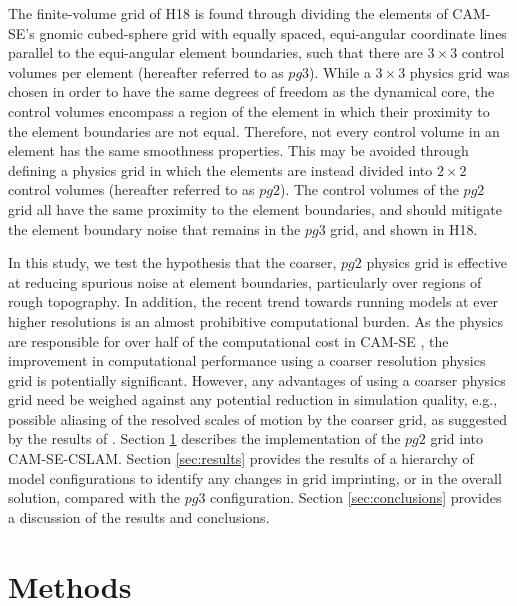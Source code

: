 \documentclass{agujournal}
\begin{document}
The finite-volume grid of H18 is found through dividing the elements of CAM-SE's gnomic cubed-sphere grid with equally spaced, equi-angular coordinate lines parallel to the equi-angular element boundaries, such that there are $3\times 3$ control volumes per element (hereafter referred to as $pg3$). While a $3\times 3$ physics grid was chosen in order to have the same degrees of freedom as the dynamical core, the control volumes encompass a region of the element in which their proximity to the element boundaries are not equal. Therefore, not every control volume in an element has the same smoothness properties. This may be avoided through defining a physics grid in which the elements are instead divided into $2\times 2$ control volumes (hereafter referred to as $pg2$). The control volumes of the $pg2$ grid all have the same proximity to the element boundaries, and should mitigate the element boundary noise that remains in the $pg3$ grid, and shown in H18.

In this study, we test the hypothesis that the coarser, $pg2$ physics grid is effective at reducing spurious noise at element boundaries, particularly over regions of rough topography. In addition, the recent trend towards running models at ever higher resolutions is an almost prohibitive computational burden. As the physics are responsible for over half of the computational cost in CAM-SE \citep{LetAl2018JAMES}, the improvement in computational performance using a coarser resolution physics grid is potentially significant. However, any advantages of using a coarser physics grid need be weighed against any potential reduction in simulation quality, e.g., possible aliasing of the resolved scales of motion by the coarser grid, as suggested by the results of \cite{W1999T}. Section \ref{sec:methods} describes the implementation of the $pg2$ grid into CAM-SE-CSLAM. Section \ref{sec:results} provides the results of a hierarchy of model configurations to identify any changes in grid imprinting, or in the overall solution, compared with the $pg3$ configuration. Section \ref{sec:conclusions} provides a discussion of the results and conclusions.

\section{Methods}\label{sec:methods}


\end{document}
